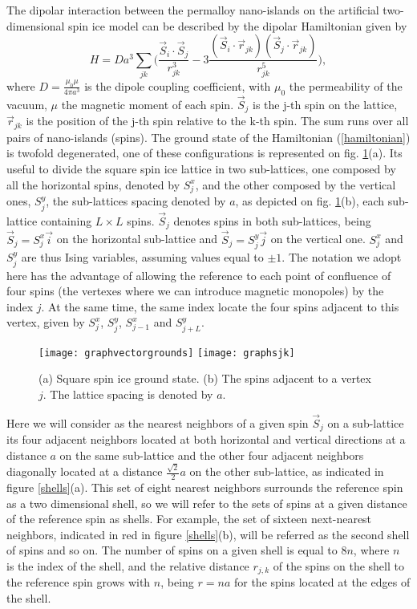 \documentclass[aps,showkeys,groupedaddress]{revtex4}
\begin{document}
The dipolar interaction between the permalloy nano-islands on the artificial two-dimensional spin ice model can be described by the dipolar Hamiltonian given by
\begin{equation}
H = D a^3 \sum_{jk} \Big( \frac{\vec{S}_i \cdot \vec{S}_j}{r^3_{jk}} - 3 \frac{(\vec{S}_i \cdot \vec{r}_{jk})(\vec{S}_j \cdot \vec{r}_{jk})}{r^5_{jk}}\Big), \label{hamiltonian}
\end{equation}
where $D=\frac{\mu_0 \mu}{4 \pi a^3}$ is the dipole coupling coefficient, with $\mu_0$ the permeability of the vacuum, $\mu$ the magnetic moment of each spin. $\vec{S}_j$ is the j-th spin on the lattice, $\vec{r}_{jk}$ is the position of the j-th spin relative to the k-th spin. The sum runs over all pairs of nano-islands (spins). The ground state of the Hamiltonian (\ref{hamiltonian}) is twofold degenerated, one of these configurations is represented on fig. \ref{sjk}(a). Its useful to divide the square spin ice lattice in two sub-lattices, one composed by all the horizontal spins, denoted by $S^x_j$, and the other composed by the vertical ones, $S^y_j$, the sub-lattices spacing denoted by $a$, as depicted on fig. \ref{sjk}(b), each sub-lattice containing $L \times L$ spins. $\vec{S}_j$ denotes spins in both sub-lattices, being $\vec{S}_j = S^x_j \vec{i}$ on the horizontal sub-lattice and $\vec{S}_j = S^y_j \vec{j}$ on the vertical one. $S^x_j$ and $S^y_j$ are thus Ising variables, assuming values equal to $\pm 1$.  The notation we adopt here has the advantage of allowing the reference to each point of confluence of four spins (the vertexes where we can introduce magnetic monopoles) by the index $j$. At the same time, the same index locate the four spins adjacent to this vertex, given by $S^x_j$, $S^y_j$, $S^x_{j-1}$ and $S^y_{j+L}$. 

\begin{figure}[ht]
\begin{center}
\texttt{[image: graphvectorgrounds]} \texttt{[image: graphsjk]}
\end{center}
\caption{(a) Square spin ice ground state. (b) The spins adjacent to a vertex $j$. The lattice spacing is denoted by $a$.}
\label{sjk}
\end{figure}

Here we will consider as the nearest neighbors of a given spin $\vec{S}_{j}$ on a sub-lattice its four adjacent neighbors located at both horizontal and vertical directions at a distance $a$ on the same sub-lattice and the other four adjacent neighbors diagonally located at a distance $\frac{\sqrt{2}}{2} a$ on the other sub-lattice, as indicated in figure \ref{shells}(a). This set of eight nearest neighbors surrounds the reference spin as a two dimensional shell, so we will refer to the sets of spins at a given distance of the reference spin as shells. For example, the set of sixteen next-nearest neighbors, indicated in red in figure \ref{shells}(b), will be referred as the second shell of spins and so on. The number of spins on a given shell is equal to $8n$, where $n$ is the index of the shell, and the relative distance $r_{j,k}$ of the spins on the shell to the reference spin grows with $n$, being $r=na$ for the spins located at the edges of the shell.
\end{document}
